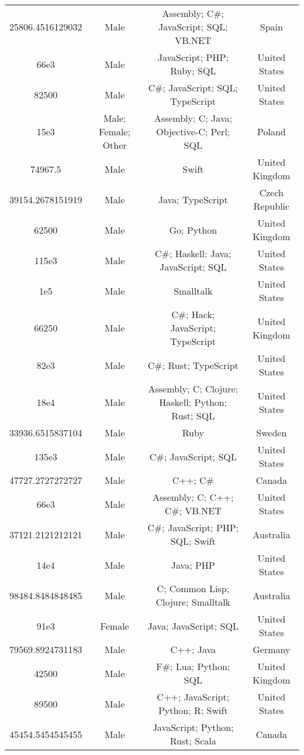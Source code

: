 \begin{center}
\begin{tabular}{ |c|c|c|c| }
25806.4516129032  &  Male  &  Assembly; C\#; JavaScript; SQL; VB.NET  &  Spain  \\ 
66e3  &  Male  &  JavaScript; PHP; Ruby; SQL  &  United States  \\ 
82500  &  Male  &  C\#; JavaScript; SQL; TypeScript  &  United States  \\ 
15e3  &  Male; Female; Other  &  Assembly; C; Java; Objective-C; Perl; SQL  &  Poland  \\ 
74967.5  &  Male  &  Swift  &  United Kingdom  \\ 
39154.2678151919  &  Male  &  Java; TypeScript  &  Czech Republic  \\ 
62500  &  Male  &  Go; Python  &  United Kingdom  \\ 
115e3  &  Male  &  C\#; Haskell; Java; JavaScript; SQL  &  United States  \\ 
1e5  &  Male  &  Smalltalk  &  United States  \\ 
66250  &  Male  &  C\#; Hack; JavaScript; TypeScript  &  United Kingdom  \\ 
82e3  &  Male  &  C\#; Rust; TypeScript  &  United States  \\ 
18e4  &  Male  &  Assembly; C; Clojure; Haskell; Python; Rust; SQL  &  United States  \\ 
33936.6515837104  &  Male  &  Ruby  &  Sweden  \\ 
135e3  &  Male  &  C\#; JavaScript; SQL  &  United States  \\ 
47727.2727272727  &  Male  &  C++; C\#  &  Canada  \\ 
66e3  &  Male  &  Assembly; C; C++; C\#; VB.NET  &  United States  \\ 
37121.2121212121  &  Male  &  C\#; JavaScript; PHP; SQL; Swift  &  Australia  \\ 
14e4  &  Male  &  Java; PHP  &  United States  \\ 
98484.8484848485  &  Male  &  C; Common Lisp; Clojure; Smalltalk  &  Australia  \\ 
91e3  &  Female  &  Java; JavaScript; SQL  &  United States  \\ 
79569.8924731183  &  Male  &  C++; Java  &  Germany  \\ 
42500  &  Male  &  F\#; Lua; Python; SQL  &  United Kingdom  \\ 
89500  &  Male  &  C++; JavaScript; Python; R; Swift  &  United States  \\ 
45454.5454545455  &  Male  &  JavaScript; Python; Rust; Scala  &  Canada  \\ 

\end{tabular}
\end{center}
